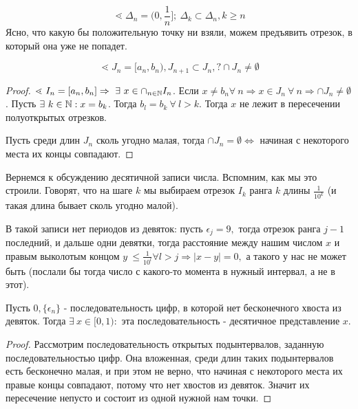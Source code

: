 \documentclass[12pt]{report}
\begin{document}
\begin{ex}
$$\lessdot \Delta_n = (0, \frac{1}{n}]; ~\Delta_k \subset \Delta_n, k \ge n$$
Ясно, что какую бы положительную точку ни взяли, можем предъявить отрезок, в который она уже не попадет.
\end{ex}

\begin{st}
$$\lessdot J_n = [a_n, b_n), J_{n + 1} \subset J_n, ? \cap J_n \neq \emptyset$$
\end{st}
\begin{proof}
$\lessdot ~I_n = [a_n, b_n] \Rightarrow ~\exists ~x \in \cap_{n \in \mathbb{N}}I_n$. Если $x \neq b_n \forall ~n \Rightarrow x \in J_n ~\forall ~n \Rightarrow \cap J_n \neq \emptyset$. Пусть $\exists ~k \in \mathbb{N}: x= b_k$. Тогда $b_l = b_k ~\forall ~l > k$. Тогда $x$ не лежит в пересечении полуоткрытых отрезков.

Пусть среди длин $J_n$ сколь угодно малая, тогда $\cap J_n = \emptyset \Leftrightarrow$ начиная с некоторого места их концы совпадают.
\end{proof}

Вернемся к обсуждению десятичной записи числа. Вспомним, как мы это строили. Говорят, что на шаге $k$ мы выбираем отрезок $I_k$ ранга $k$ длины $\frac{1}{10^k}$ (и такая длина бывает сколь угодно малой).

В такой записи нет периодов из девяток: пусть $\epsilon_j = 9,$ тогда отрезок ранга $j - 1$ последний, и дальше одни девятки, тогда расстояние между нашим числом $x$ и правым выколотым концом $y ~\le \frac{1}{10^l} \forall l  > j \Rightarrow |x - y| = 0,$ а такого у нас не может быть (послали бы тогда число с какого-то момента в нужный интервал, а не в этот).

\begin{st}
Пусть $0, \{\epsilon_n\}$ - последовательность цифр, в которой нет бесконечного хвоста из девяток. Тогда $\exists ~x \in [0, 1):$ эта последовательность - десятичное представление $x$.
\end{st}
\begin{proof}
Рассмотрим последовательность открытых подынтервалов, заданную последовательностью цифр. Она вложенная, среди длин таких подынтервалов есть бесконечно малая, и при этом не верно, что начиная с некоторого места их правые концы совпадают, потому что нет хвостов из девяток. Значит их пересечение непусто и состоит из одной нужной нам точки.
\end{proof}
\end{document}
